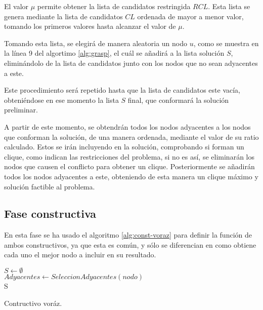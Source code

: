 El valor $\mu$ permite obtener la lista de candidatos restringida $RCL$. Esta lista se genera mediante la lista de candidatos $CL$ ordenada de mayor a menor valor, tomando los primeros valores hasta alcanzar el valor de $\mu$.

Tomando esta lista, se elegirá de manera aleatoria un nodo $u$, como se muestra en la línea 9 del algortimo \ref{alg:grasp}, el cuál se añadirá a la lista solución $S$, eliminándolo de la lista de candidatos junto con los nodos que no sean adyacentes a este. 

Este procedimiento será repetido hasta que la lista de candidatos este vacía, obteniéndose en ese momento la lista $S$ final, que conformará la solución preliminar.

A partir de este momento, se obtendrán todos los nodos adyacentes a los nodos que conforman la solución, de una manera ordenada, mediante el valor de su ratio calculado. Estos se irán incluyendo en la solución, comprobando si forman un clique, como indican las restricciones del problema, si no es así, se eliminarán los nodos que causen el conflicto para obtener un clique. Posteriormente se añadirán todos los nodos adyacentes a este, obteniendo de esta manera un clique máximo y solución factible al problema.

\subsection{Fase constructiva}
\label{sec:faseConstructiva}
En esta fase se ha usado el algoritmo \ref{alg:const-voraz} para definir la función de ambos constructivos, ya que esta es común, y sólo se diferencian en como obtiene cada uno el mejor nodo a incluir en su resultado.\\

\begin{algorithm}[H]
	\SetAlgoLined
	$ S \gets \emptyset $  \\[0.2cm]
	$ Adyacentes \gets  SeleccionAdyacentes(nodo) $  \\[0.2cm]
	\Return S
	\caption{Contructivo voráz.}
	\label{alg:const-voraz}
\end{algorithm}

